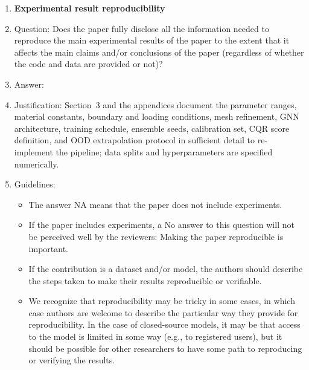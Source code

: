 \documentclass{article}
\begin{document}
\begin{enumerate}
    \item {\bf Experimental result reproducibility}
    \item[] Question: Does the paper fully disclose all the information needed to reproduce the main experimental results of the paper to the extent that it affects the main claims and/or conclusions of the paper (regardless of whether the code and data are provided or not)?
    \item[] Answer: \answerYes{}
    \item[] Justification: Section~3 and the appendices document the parameter ranges, material constants, boundary and loading conditions, mesh refinement, GNN architecture, training schedule, ensemble seeds, calibration set, CQR score definition, and OOD extrapolation protocol in sufficient detail to re-implement the pipeline; data splits and hyperparameters are specified numerically.
    \item[] Guidelines:
    \begin{itemize}
        \item The answer NA means that the paper does not include experiments.
        \item If the paper includes experiments, a No answer to this question will not be perceived well by the reviewers: Making the paper reproducible is important.
        \item If the contribution is a dataset and/or model, the authors should describe the steps taken to make their results reproducible or verifiable.
        \item We recognize that reproducibility may be tricky in some cases, in which case authors are welcome to describe the particular way they provide for reproducibility. In the case of closed-source models, it may be that access to the model is limited in some way (e.g., to registered users), but it should be possible for other researchers to have some path to reproducing or verifying the results.
    \end{itemize}


\end{enumerate}
\end{document}
